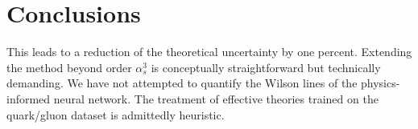 \section{Conclusions}\label{sec:conclusions}

This leads to a reduction of the theoretical uncertainty by one percent.
Extending the method beyond order $\alpha_s^3$ is conceptually
straightforward but technically demanding. We have not attempted to
quantify the Wilson lines of the physics-informed neural network. The
treatment of effective theories trained on the quark/gluon dataset is
admittedly heuristic.

